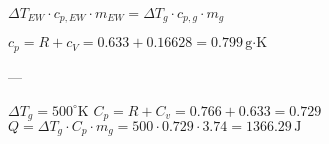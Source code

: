 \( \Delta T_{EW} \cdot c_{p,EW} \cdot m_{EW} = \Delta T_{g} \cdot c_{p,g} \cdot m_g \)  

\( c_p = R + c_V = 0.633 + 0.16628 = 0.799 \, \text{g·K} \)  

---

\( \Delta T_g = 500^\circ \text{K} \)  
\( C_p = R + C_v = 0.766 + 0.633 = 0.729 \)  
\( Q = \Delta T_g \cdot C_p \cdot m_g = 500 \cdot 0.729 \cdot 3.74 = 1366.29 \, \text{J} \)